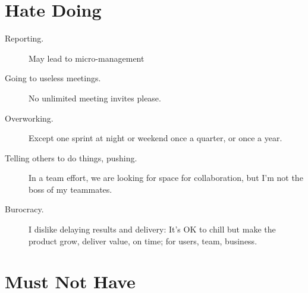 \documentclass[10pt, a4paper, twocolumn]{article}
\begin{document}


%


%
%
%

\vfill\eject

\section*{Hate Doing}

\begin{description}
 \item[Reporting.] May lead to micro-management
 \item[Going to useless meetings.] No unlimited meeting invites please.
 \item[Overworking.] Except one sprint at night or weekend once a quarter, or once a year.
 \item[Telling others to do things, pushing.] In a team effort, we are looking for space for collaboration, but I'm not the boss of my teammates.
  \item[Burocracy.] I dislike delaying results and delivery:
 It's OK to chill
 but %
 make the product grow, deliver value, on time;
 for users, team, business.
\end{description}


  \vspace*{-20pt}

\section*{Must Not Have}
\end{document}
